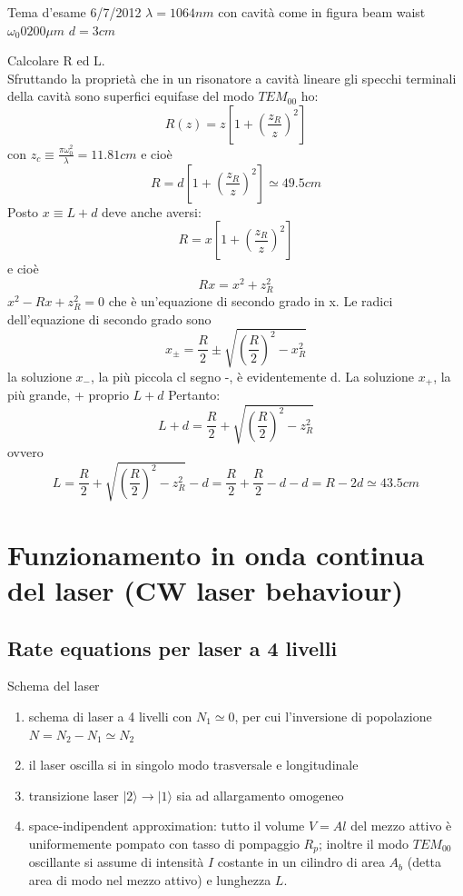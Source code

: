 \documentclass{book}
\def \l {\lambda}
\newcommand{\lve}[1]{|#1\rangle}
\theoremstyle{remark}
\begin{document}
Tema d'esame 6/7/2012
$\l = 1064 nm$ con cavità come in figura
beam waist $\omega_0 0 200 \mu m$ $d = 3cm$

Calcolare R ed L.\\
Sfruttando la proprietà che in un risonatore a cavità lineare gli specchi terminali della cavità sono superfici equifase del modo $TEM_{00}$ ho:
\begin{equation*}
R(z) = z \left[1+\left(\frac{z_R}{z}\right)^2 \right]
\end{equation*}
con $z_c \equiv \frac{\pi \omega_0^2}{\l} = 11.81 cm$
e cioè
\begin{equation*}
R = d \left[1+\left(\frac{z_R}{z}\right)^2 \right] \simeq 49.5 cm
\end{equation*}
Posto $x \equiv L + d$ deve anche aversi:
\begin{equation*}
R = x \left[1+\left(\frac{z_R}{z}\right)^2 \right] 
\end{equation*}
e cioè
\begin{equation*}
R x = x^2 + z_R^2
\end{equation*}
$x^2 -R x + z_R^2 = 0$ che è un'equazione di secondo grado in x.
Le radici dell'equazione di secondo grado sono
\begin{equation*}
x_\pm = \frac{R}{2} \pm \sqrt{\left(\frac{R}{2}\right)^2 - x_R^2}
\end{equation*}
la soluzione $x_-$, la più piccola cl segno -, è evidentemente d.
La soluzione $x_+$, la più grande, + proprio $L + d$
Pertanto:
\begin{equation*}
L + d = \frac{R}{2} + \sqrt{\left(\frac{R}{2}\right)^2 - z_R^2}
\end{equation*}
ovvero
\begin{equation*}
L = \frac{R}{2} + \sqrt{\left(\frac{R}{2}\right)^2 - z_R^2} - d = \frac{R}{2} + \frac{R}{2} - d - d = R - 2d \simeq 43.5 cm
\end{equation*}


\chapter{Funzionamento in onda continua del laser (CW laser behaviour)}
\section{Rate equations per laser a 4 livelli}
Schema del laser
\begin{enumerate}
\item schema di laser a 4 livelli con $N_1 \simeq 0$, per cui l'inversione di popolazione $N=N_2-N_1\simeq N_2$
\item il laser oscilla si in singolo modo trasversale e longitudinale
\item transizione laser $\lve{2} \rightarrow \lve{1}$ sia ad allargamento omogeneo
\item space-indipendent approximation: tutto il volume $V = A l$ del mezzo attivo è uniformemente pompato con tasso di pompaggio $R_p$; inoltre il modo $TEM_{00}$ oscillante si assume di intensità $I$ costante in un cilindro di area $A_b$ (detta area di modo nel mezzo attivo) e lunghezza $L$.
\end{enumerate}
\end{document}
